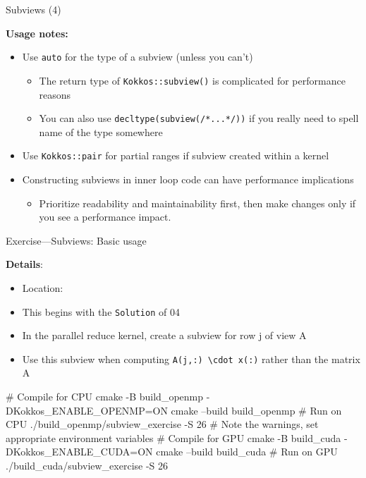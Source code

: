 \begin{frame}[fragile]{Subviews (4)}

  \textbf{Usage notes:}


  \begin{itemize}
    \item{Use \texttt{auto} for the type of a subview (unless you can't)}
      \pause
  \begin{itemize}
      \pause
    \item{The return type of \texttt{Kokkos::subview()} is complicated for performance reasons}
      \pause
    \item{You can also use \texttt{decltype(subview(/*...*/))} if you really need to spell name of the type somewhere}
  \end{itemize}
      \pause
    \item{Use \texttt{Kokkos::pair} for partial ranges if subview created within a kernel}
      \pause
    \item{Constructing subviews in inner loop code can have performance implications}
      \pause
    \begin{itemize}
      \item{Prioritize readability and maintainability first, then make changes only if you see a performance impact.}
      \pause
    \end{itemize}
  \end{itemize}

\end{frame}


\begin{frame}[fragile]{Exercise---Subviews: Basic usage}

  \textbf{Details}:
  \begin{small}
  \begin{itemize}
    \item Location: 
    \item This begins with the \texttt{Solution} of 04
    \item In the parallel reduce kernel, create a subview for row j of view A
    \item Use this subview when computing \texttt{A(j,:) \textbackslash cdot x(:)} rather than the matrix A
  \end{itemize}
  \end{small}

\begin{code}
  # Compile for CPU
  cmake -B build_openmp -DKokkos_ENABLE_OPENMP=ON
  cmake --build build_openmp
  # Run on CPU
  ./build_openmp/subview_exercise -S 26
  # Note the warnings, set appropriate environment variables
  # Compile for GPU
  cmake -B build_cuda -DKokkos_ENABLE_CUDA=ON
  cmake --build build_cuda
  # Run on GPU
  ./build_cuda/subview_exercise -S 26
\end{code}

\end{frame}

